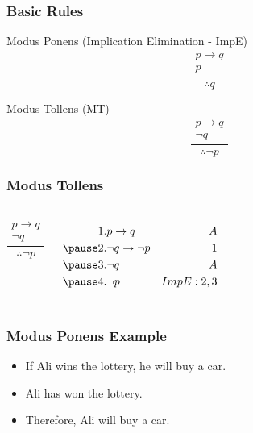 \documentclass[dvipsnames]{beamer}
\begin{document}
\begin{frame}
  \frametitle{Basic Rules}

  \begin{block}{Modus Ponens (Implication Elimination - ImpE)}
    \[
    \frac
      {
        \begin{array}{c}
          p \rightarrow q\\
          p
        \end{array}
      }
      {
        \therefore q
      }
    \]
  \end{block}

  \pause
  \begin{block}{Modus Tollens (MT)}
    \[
    \frac
      {
        \begin{array}{c}
          p \rightarrow q\\
          \neg q
        \end{array}
      }
      {
        \therefore \neg p
      }
    \]
  \end{block}
\end{frame}

\begin{frame}
  \frametitle{Modus Tollens}

  \begin{example}
    \begin{columns}
      \[
      \frac
        {
          \begin{array}{c}
            p \rightarrow q\\
            \neg q
          \end{array}
        }
        {
          \therefore \neg p
        }
      \]

      \pause
      \begin{eqnarray*}
        1. & p \rightarrow q           & A\\
        \pause
        2. & \neg q \rightarrow \neg p & 1\\
        \pause
        3. & \neg q                    & A\\
        \pause
        4. & \neg p                    & ImpE:2,3\\
      \end{eqnarray*}
    \end{columns}
  \end{example}
\end{frame}

\begin{frame}
  \frametitle{Modus Ponens Example}

  \begin{example}
    \begin{itemize}
      \item If Ali wins the lottery, he will buy a car.
      \item Ali has won the lottery.

      \pause
      \medskip
      \item Therefore, Ali will buy a car.
    \end{itemize}
  \end{example}
\end{frame}
\end{document}

